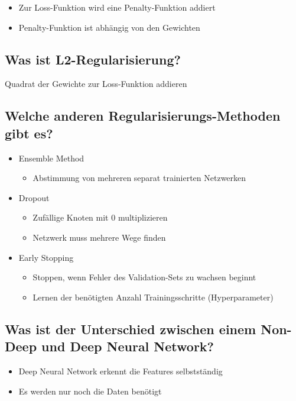 \documentclass[a4paper]{article}
\begin{document}
		\begin{itemize}
			\item Zur Loss-Funktion wird eine Penalty-Funktion addiert
			\item Penalty-Funktion ist abhängig von den Gewichten
		\end{itemize}
	
		\subsection{Was ist L2-Regularisierung?}
		
		Quadrat der Gewichte zur Loss-Funktion addieren
		
		\subsection{Welche anderen Regularisierungs-Methoden gibt es?}
		
		\begin{itemize}
			\item Ensemble Method
				\begin{itemize}
					\item Abstimmung von mehreren separat trainierten Netzwerken
				\end{itemize}
			\item Dropout
				\begin{itemize}
					\item Zufällige Knoten mit 0 multiplizieren
					\item Netzwerk muss mehrere Wege finden
				\end{itemize}
			\item Early Stopping
				\begin{itemize}
					\item Stoppen, wenn Fehler des Validation-Sets zu wachsen beginnt
					\item Lernen der benötigten Anzahl Trainingsschritte (Hyperparameter)
				\end{itemize}
		\end{itemize}
	
		\subsection{Was ist der Unterschied zwischen einem Non-Deep und Deep Neural Network?}
		
		\begin{itemize}
			\item Deep Neural Network erkennt die Features selbstständig
			\item Es werden nur noch die Daten benötigt
		\end{itemize}
	
\end{document}
